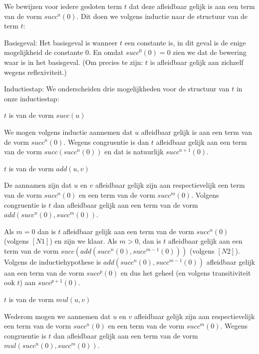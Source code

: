\documentclass[a4paper,11pt]{article}
\begin{document}
We bewijzen voor iedere gesloten term $t$ dat deze afleidbaar gelijk is aan
een term van de vorm $succ^{n}(0)$. Dit doen we volgens inductie naar de
structuur van de term $t$:

\begin{description}

\item{Basisgeval:}
  Het basisgeval is wanneer $t$ een constante is, in dit geval is de enige
  mogelijkheid de constante $0$. En omdat $succ^0(0) = 0$ zien we dat de
  bewering waar is in het basisgeval. (Om precies te zijn: $t$ is afleidbaar
  gelijk aan zichzelf wegens reflexiviteit.)

\item{Inductiestap:}
  We onderscheiden drie mogelijkheden voor de structuur van $t$ in onze
  inductiestap:

  \begin{description}

  \item{$t$ is van de vorm $succ(u)$}

    We mogen volgens inductie aannemen dat $u$ afleidbaar gelijk is aan een
    term van de vorm $succ^{n}(0)$. Wegens congruentie is dan $t$ afleidbaar
    gelijk aan een term van de vorm $succ(succ^{n}(0))$ en dat is natuurlijk
    $succ^{n+1}(0)$.

  \item{$t$ is van de vorm $add(u, v)$}

    De aannamen zijn dat $u$ en $v$ afleidbaar gelijk zijn aan respectievelijk
    een term van de vorm $succ^{n}(0)$ en een term van de vorm
    $succ^{m}(0)$. Volgens congruentie is $t$ dan afleidbaar gelijk aan een
    term van de vorm $add(succ^{n}(0), succ^{m}(0))$.

    Als $m=0$ dan is $t$ afleidbaar gelijk aan een term van de vorm
    $succ^{n}(0)$ (volgens $[N1]$) en zijn we klaar. Als $m>0$, dan is $t$
    afleidbaar gelijk aan een term van de vorm $succ(add(succ^{n}(0),                                                        
    succ^{m-1}(0)))$ (volgens $[N2]$). Volgens de inductiehypothese is
    $add(succ^{n}(0), succ^{m-1}(0))$ afleidbaar gelijk aan een term van de
    vorm $succ^{p}(0)$ en dus het geheel (en volgens transitiviteit ook $t$)
    aan $succ^{p+1}(0)$.

  \item{$t$ is van de vorm $mul(u, v)$}

    Wederom mogen we aannemen dat $u$ en $v$ afleidbaar gelijk zijn aan
    respectievelijk een term van de vorm $succ^{n}(0)$ en een term van de vorm
    $succ^{m}(0)$. Wegens congruentie is $t$ dan afleidbaar gelijk aan een
    term van de vorm $mul(succ^{n}(0), succ^{m}(0))$.


\end{description}
\end{description}
\end{document}
